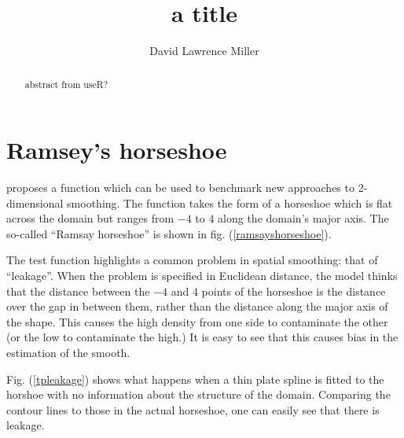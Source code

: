 \documentclass[a4paper,10pt]{amsart}
\title{a title}
\author{David Lawrence Miller}
\begin{document}
\begin{abstract}
abstract from useR?
\end{abstract}


\newtheorem{thm}{Theorem}[section]

\newtheorem{defn}{Definition}[section]

\maketitle



\section{Ramsey's horseshoe}

\cite{ramsay} proposes a function which can be used to benchmark new approaches to 2-dimensional smoothing. The function takes the form of a horseshoe which is flat across the domain but ranges from $-4$ to $4$ along the domain's major axis. The so-called ``Ramsay horseshoe'' is shown in fig. (\ref{ramsayshorseshoe}).

The test function highlights a common problem in spatial smoothing: that of ``leakage''. When the problem is specified in Euclidean distance, the model thinks that the distance between the $-4$ and $4$ points of the horseshoe is the distance over the gap in between them, rather than the distance along the major axis of the shape. This causes the high density from one side to contaminate the other (or the low to contaminate the high.) It is easy to see that this causes bias in the estimation of the smooth.

Fig. (\ref{tpleakage}) shows what happens when a thin plate spline is fitted to the horshoe with no information about the structure of the domain. Comparing the contour lines to those in the actual horseshoe, one can easily see that there is leakage.
\end{document}
